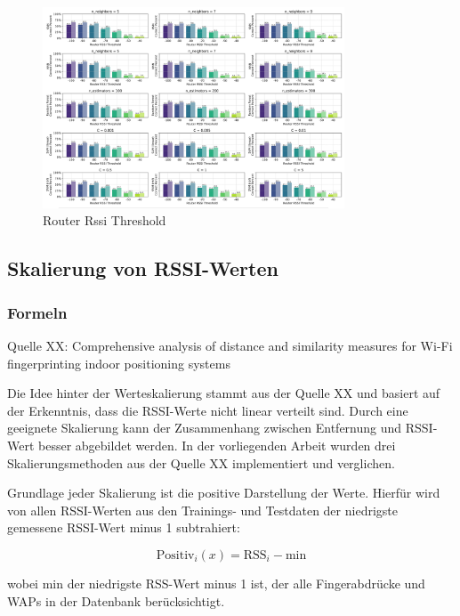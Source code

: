 \begin{figure}[H]
    \centering
    \includegraphics[width=0.8\textwidth]{images/6_router_rssi_threshold_01.png}
    \caption{Router Rssi Threshold}
    \label{fig:6_router_rssi_threshold_01}
\end{figure}

\subsection{Skalierung von RSSI-Werten}

\subsubsection{Formeln}

Quelle XX: Comprehensive analysis of distance and similarity measures for Wi-Fi ﬁngerprinting indoor positioning systems

Die Idee hinter der Werteskalierung stammt aus der Quelle XX und basiert auf der Erkenntnis, dass die RSSI-Werte nicht linear verteilt sind. Durch eine geeignete Skalierung kann der Zusammenhang zwischen Entfernung und RSSI-Wert besser abgebildet werden. In der vorliegenden Arbeit wurden drei Skalierungsmethoden aus der Quelle XX implementiert und verglichen.

Grundlage jeder Skalierung ist die positive Darstellung der Werte. Hierfür wird von allen RSSI-Werten aus den Trainings- und Testdaten der niedrigste gemessene RSSI-Wert minus 1 subtrahiert:

\begin{equation}
    \text{Positiv}_i(x) = \text{RSS}_i - \text{min}
    \label{eq:positive_values_representation}
\end{equation}

wobei \(\text{min}\) der niedrigste RSS-Wert minus 1 ist, der alle Fingerabdrücke und WAPs in der Datenbank berücksichtigt.

